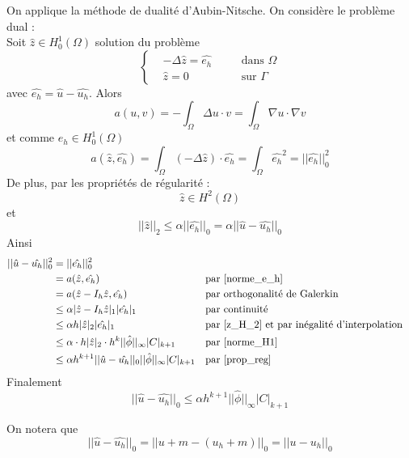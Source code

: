 On applique la méthode de dualité d'Aubin-Nitsche. On considère le problème dual : \\
Soit $\hat{z}\in H_0^1(\Omega)$ solution du problème
$$\left\{\begin{aligned}
	&-\Delta\hat{z}=\hat{e_h} \quad &&\text{dans }\Omega \\
	&\hat{z}=0 \quad &&\text{sur } \Gamma
\end{aligned}\right.$$
avec $\hat{e_h}=\hat{u}-\hat{u_h}$.
Alors
$$a(u,v)=-\int_\Omega\Delta u\cdot v=\int_\Omega\nabla u\cdot\nabla v$$
et comme $e_h\in H_0^1(\Omega)$
\begin{equation}
	a(\hat{z},\hat{e_h})=\int_\Omega(-\Delta \hat{z})\cdot \hat{e_h}=\int_\Omega \hat{e_h}^2=||\hat{e_h}||_0^2
	\label{norme_e_h}
\end{equation}
De plus, par les propriétés de régularité : 
\begin{equation}
	\hat{z}\in H^2(\Omega)
	\label{z_H_2}
\end{equation}
et
\begin{equation}
	||\hat{z}||_2\le \alpha||\hat{e_h}||_0 =\alpha||\hat{u}-\hat{u_h}||_0
	\label{prop_reg}
\end{equation}
Ainsi
\begin{align*}
	||\hat{u}-\hat{u_h}||_0^2&=||\hat{e_h}||_0^2 \\
	&=a(\hat{z},\hat{e_h}) &&\text{par \ref{norme_e_h}} \\
	&=a(\hat{z}-I_h\hat{z},\hat{e_h}) &&\text{par orthogonalité de Galerkin} \\
	&\le\alpha|\hat{z}-I_h\hat{z}|_1|\hat{e_h}|_1 &&\text{par continuité} \\
	&\le\alpha h|\hat{z}|_2|\hat{e_h}|_1 &&\text{par \ref{z_H_2} et par inégalité d'interpolation} \\
	&\le\alpha \cdot h|\hat{z}|_2 \cdot h^k||\hat{\phi}||_\infty |C|_{k+1} &&\text{par \ref{norme_H1}} \\
	&\le\alpha h^{k+1}||\hat{u}-\hat{u_h}||_0||\hat{\phi}||_\infty |C|_{k+1} &&\text{par \ref{prop_reg}}
\end{align*}
Finalement
\begin{equation}
	\boxed{||\hat{u}-\hat{u_h}||_0\le\alpha h^{k+1}||\hat{\phi}||_\infty |C|_{k+1}}
\end{equation}

\begin{Rem}
	On notera que
	$$||\hat{u}-\hat{u_h}||_0=||u+m-(u_h+m)||_0=||u-u_h||_0$$
\end{Rem}

